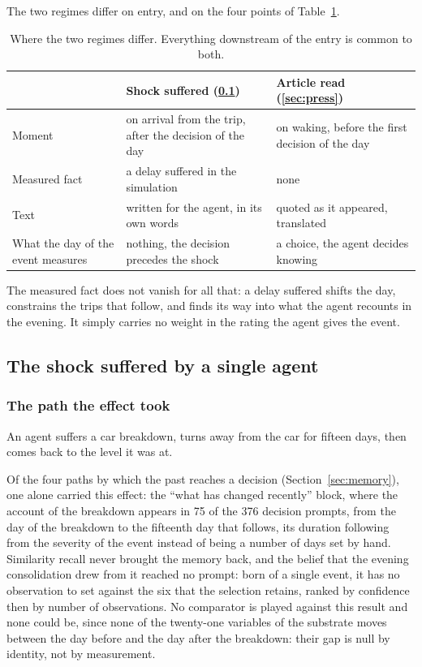 The two regimes differ on entry, and on the four points of Table~\ref{tab:entry}.

\begin{table}[tp]
  \caption{Where the two regimes differ. Everything downstream of the entry is common to both.}
  \label{tab:entry}
  \begin{tabular}{@{}lp{}p{}@{}}
    \toprule
     & Shock suffered (\ref{sec:shock}) & Article read (\ref{sec:press}) \\
    \midrule
    Moment & on arrival from the trip, after the decision of the day & on waking, before the first decision of the day \\
    Measured fact & a delay suffered in the simulation & none \\
    Text & written for the agent, in its own words & quoted as it appeared, translated \\
    What the day of the event measures & nothing, the decision precedes the shock & a choice, the agent decides knowing \\
    \bottomrule
  \end{tabular}
\end{table}

The measured fact does not vanish for all that: a delay suffered shifts the day, constrains the trips that follow, and finds its way into what the agent recounts in the evening. It simply carries no weight in the rating the agent gives the event.

\subsection{The shock suffered by a single agent}
\label{sec:shock}

\subsubsection{The path the effect took}

An agent suffers a car breakdown, turns away from the car for fifteen days, then comes back to the level it was at.

Of the four paths by which the past reaches a decision (Section~\ref{sec:memory}), one alone carried this effect: the ``what has changed recently'' block, where the account of the breakdown appears in 75 of the 376 decision prompts, from the day of the breakdown to the fifteenth day that follows, its duration following from the severity of the event instead of being a number of days set by hand. Similarity recall never brought the memory back, and the belief that the evening consolidation drew from it reached no prompt: born of a single event, it has no observation to set against the six that the selection retains, ranked by confidence then by number of observations. No comparator is played against this result and none could be, since none of the twenty-one variables of the substrate moves between the day before and the day after the breakdown: their gap is null by identity, not by measurement.

